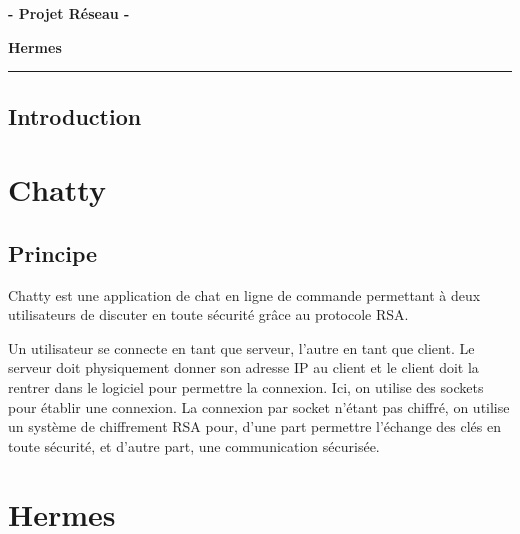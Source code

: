\documentclass{article}
\begin{document}


\begin{center}
    \textbf{ - Projet Réseau - }

    \Large{\textbf{Hermes}}
\end{center}

\rule{\linewidth}{1.5pt}



\justify


\subsection{Introduction}

\section{Chatty}

\subsection{Principe}

Chatty est une application de chat en ligne de commande permettant à deux utilisateurs de discuter en toute sécurité grâce au protocole RSA. 

Un utilisateur se connecte en tant que serveur, l'autre en tant que client. 
Le serveur doit physiquement donner son adresse IP au client et le client doit la rentrer dans le logiciel pour 
permettre la connexion. Ici, on utilise des sockets pour établir une connexion. La connexion par socket n'étant pas chiffré, 
on utilise un système de chiffrement RSA pour, d'une part permettre l'échange des clés en toute sécurité, et d'autre part, 
une communication sécurisée. 




\section{Hermes}
\end{document}
